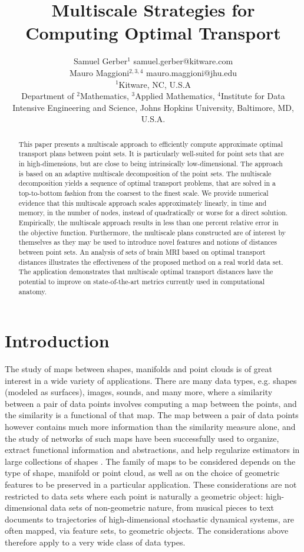 \documentclass[twoside,11pt]{article}
\title{Multiscale Strategies for Computing Optimal Transport}
\author{\name Samuel Gerber$^1$ \email samuel.gerber@kitware.com \\
  \name Mauro Maggioni$^{2,3,4}$ \email mauro.maggioni@jhu.edu \\
       \addr $^1$Kitware, NC, U.S.A\\
       \addr Department of $^2$\!Mathematics, $^3$\!Applied Mathematics, $^4$\!Institute for Data Intensive Engineering and Science, Johns Hopkins University, Baltimore, MD, U.S.A.
}
\begin{document}
\maketitle

\begin{abstract}%
This paper presents a multiscale approach to efficiently compute approximate
optimal transport plans between point sets. It is particularly well-suited for
point sets that are in high-dimensions, but are close to being intrinsically
low-dimensional.  The approach is based on an adaptive multiscale decomposition
of the point sets. The multiscale decomposition yields a sequence of optimal
transport problems, that are solved in a top-to-bottom fashion from the
coarsest to the finest scale.  We provide numerical evidence that this
multiscale approach scales approximately linearly, in time and memory, in the
number of nodes, instead of quadratically or worse for a direct solution.
Empirically, the multiscale approach results in less than one percent relative
error in the objective function.  Furthermore, the multiscale plans constructed
are of interest by themselves as they may be used to introduce novel features
and notions of distances between point sets. An analysis of sets of brain MRI
based on optimal transport distances illustrates the effectiveness of the
proposed method on a real world data set. The application demonstrates that
multiscale optimal transport distances have the potential to improve on
state-of-the-art metrics currently used in computational anatomy.  
\end{abstract}


\section{Introduction}
\label{sec:introduction}

The study of maps between shapes, manifolds and point clouds is of great
interest in a wide variety of applications. There are many data types, e.g.
shapes (modeled as surfaces), images, sounds, and many more, where a similarity
between a pair of data points involves computing a map between the points, and
the similarity is a functional of that map.  The map between a pair of data
points however contains much more information than the similarity measure
alone, and the study of networks of such maps have been successfully used to
organize, extract functional information and abstractions, and help regularize
estimators in large collections of shapes \citep{bigdata5,bigdata10,bigdata8}.
The family of maps to be considered depends on the type of shape, manifold or
point cloud, as well as on the choice of geometric features to be preserved in
a particular application.  These considerations are not restricted to data sets
where each point is naturally a geometric object: high-dimensional data sets of
non-geometric nature, from musical pieces to text documents to trajectories of
high-dimensional stochastic dynamical systems, are often mapped, via feature
sets, to geometric objects. The considerations above therefore apply to a very
wide class of data types.
\end{document}
